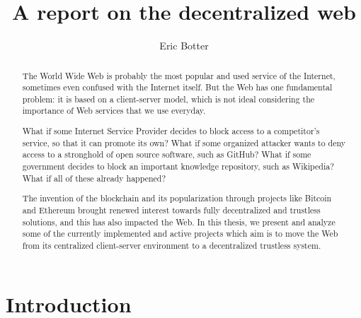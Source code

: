 \documentclass[mscthesis]{usiinfthesis}
\title{A report on the decentralized web} %
\subtitle{} %
\author{Eric Botter} %
\begin{document}
\maketitle %

\frontmatter %

\begin{abstract}
The World Wide Web is probably the most popular and used service of the Internet, sometimes even confused with the Internet itself. But the Web has one fundamental problem: it is based on a client-server model, which is not ideal considering the importance of Web services that we use everyday.

What if some Internet Service Provider decides to block access to a competitor's service, so that it can promote its own? What if some organized attacker wants to deny access to a stronghold of open source software, such as GitHub? What if some government decides to block an important knowledge repository, such as Wikipedia? What if all of these already happened? %

The invention of the blockchain and its popularization through projects like Bitcoin and Ethereum brought renewed interest towards fully decentralized and trustless solutions, and this has also impacted the Web. In this thesis, we present and analyze some of the currently implemented and active projects which aim is to move the Web from its centralized client-server environment to a decentralized trustless system.

\end{abstract}


\begin{acknowledgements}
\lipsum
\end{acknowledgements}

\tableofcontents

\mainmatter

\chapter{Introduction}\label{ch:intro}
\end{document}
